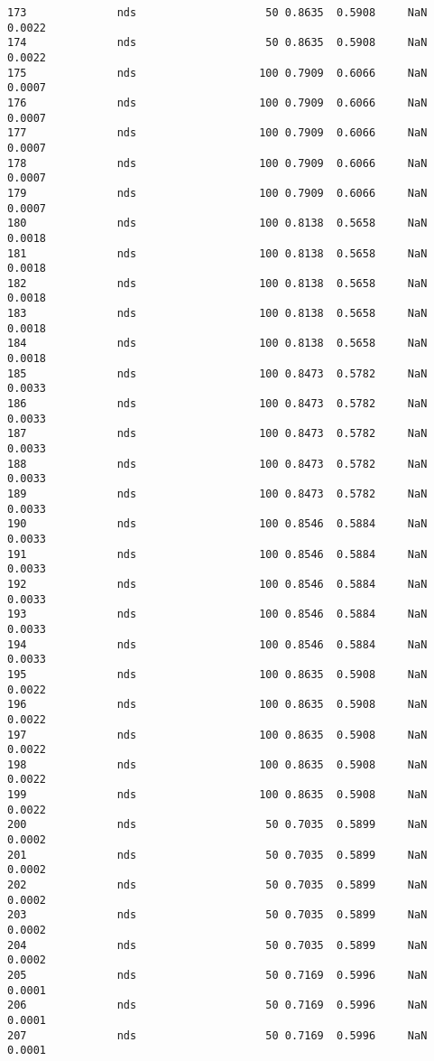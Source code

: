 \documentclass[11pt]{article}
\begin{document}
\begin{Verbatim}[commandchars=\\\{\}]
173              nds                    50 0.8635  0.5908     NaN 0.0022   
174              nds                    50 0.8635  0.5908     NaN 0.0022   
175              nds                   100 0.7909  0.6066     NaN 0.0007   
176              nds                   100 0.7909  0.6066     NaN 0.0007   
177              nds                   100 0.7909  0.6066     NaN 0.0007   
178              nds                   100 0.7909  0.6066     NaN 0.0007   
179              nds                   100 0.7909  0.6066     NaN 0.0007   
180              nds                   100 0.8138  0.5658     NaN 0.0018   
181              nds                   100 0.8138  0.5658     NaN 0.0018   
182              nds                   100 0.8138  0.5658     NaN 0.0018   
183              nds                   100 0.8138  0.5658     NaN 0.0018   
184              nds                   100 0.8138  0.5658     NaN 0.0018   
185              nds                   100 0.8473  0.5782     NaN 0.0033   
186              nds                   100 0.8473  0.5782     NaN 0.0033   
187              nds                   100 0.8473  0.5782     NaN 0.0033   
188              nds                   100 0.8473  0.5782     NaN 0.0033   
189              nds                   100 0.8473  0.5782     NaN 0.0033   
190              nds                   100 0.8546  0.5884     NaN 0.0033   
191              nds                   100 0.8546  0.5884     NaN 0.0033   
192              nds                   100 0.8546  0.5884     NaN 0.0033   
193              nds                   100 0.8546  0.5884     NaN 0.0033   
194              nds                   100 0.8546  0.5884     NaN 0.0033   
195              nds                   100 0.8635  0.5908     NaN 0.0022   
196              nds                   100 0.8635  0.5908     NaN 0.0022   
197              nds                   100 0.8635  0.5908     NaN 0.0022   
198              nds                   100 0.8635  0.5908     NaN 0.0022   
199              nds                   100 0.8635  0.5908     NaN 0.0022   
200              nds                    50 0.7035  0.5899     NaN 0.0002   
201              nds                    50 0.7035  0.5899     NaN 0.0002   
202              nds                    50 0.7035  0.5899     NaN 0.0002   
203              nds                    50 0.7035  0.5899     NaN 0.0002   
204              nds                    50 0.7035  0.5899     NaN 0.0002   
205              nds                    50 0.7169  0.5996     NaN 0.0001   
206              nds                    50 0.7169  0.5996     NaN 0.0001   
207              nds                    50 0.7169  0.5996     NaN 0.0001   

\end{Verbatim}
\end{document}

